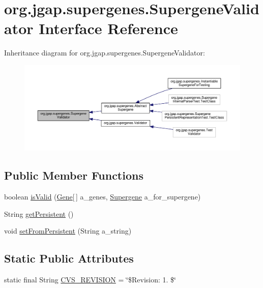 \hypertarget{interfaceorg_1_1jgap_1_1supergenes_1_1_supergene_validator}{\section{org.\-jgap.\-supergenes.\-Supergene\-Validator Interface Reference}
\label{interfaceorg_1_1jgap_1_1supergenes_1_1_supergene_validator}
}


Inheritance diagram for org.\-jgap.\-supergenes.\-Supergene\-Validator\-:
\nopagebreak
\begin{figure}[H]
\begin{center}
\leavevmode
\includegraphics[width=350pt]{interfaceorg_1_1jgap_1_1supergenes_1_1_supergene_validator__inherit__graph}
\end{center}
\end{figure}
\subsection*{Public Member Functions}
\begin{DoxyCompactItemize}
\item 
boolean \hyperlink{interfaceorg_1_1jgap_1_1supergenes_1_1_supergene_validator_ac05f4997c7b03d61a3c5365baeccef91}{is\-Valid} (\hyperlink{interfaceorg_1_1jgap_1_1_gene}{Gene}\mbox{[}$\,$\mbox{]} a\-\_\-genes, \hyperlink{interfaceorg_1_1jgap_1_1supergenes_1_1_supergene}{Supergene} a\-\_\-for\-\_\-supergene)
\item 
String \hyperlink{interfaceorg_1_1jgap_1_1supergenes_1_1_supergene_validator_a9ef86d28cc29f90d7c451460a4a818fe}{get\-Persistent} ()
\item 
void \hyperlink{interfaceorg_1_1jgap_1_1supergenes_1_1_supergene_validator_a8718b55ab8474e3b5df097ef152a93f0}{set\-From\-Persistent} (String a\-\_\-string)
\end{DoxyCompactItemize}
\subsection*{Static Public Attributes}
\begin{DoxyCompactItemize}
\item 
static final String \hyperlink{interfaceorg_1_1jgap_1_1supergenes_1_1_supergene_validator_a5b799d0019e7300bd56fe1a2125384ad}{C\-V\-S\-\_\-\-R\-E\-V\-I\-S\-I\-O\-N} = \char`\"{}\$Revision\-: 1. \$\char`\"{}
\end{DoxyCompactItemize}


